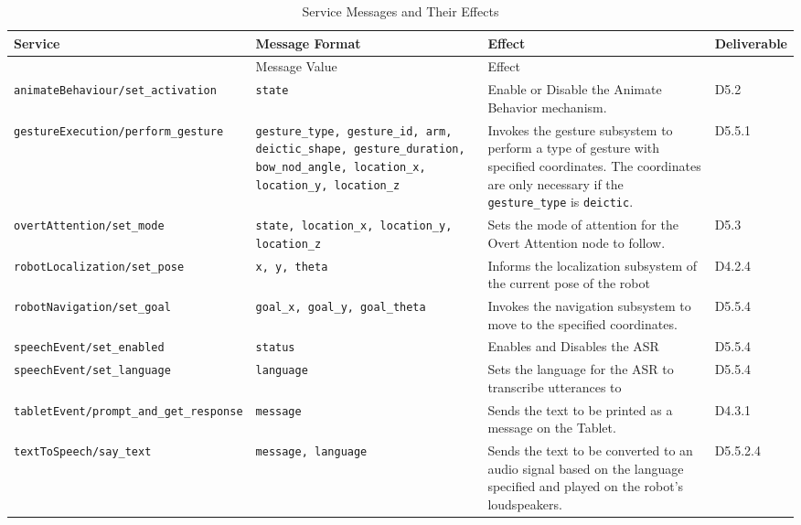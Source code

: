 \documentclass{CSSRforAfrica}
\begin{document}
{\fontsize{9pt}{12pt}\selectfont
\begin{longtable}[c]{|p{6.4cm}|p{2.9cm}|p{3cm}|p{1.4cm}|}
    \caption{Service Messages and Their Effects} \label{tab:service_messages}\\
    \hline
    \rowcolor{gray!30}
    \textnormal{Service} & \textnormal{Message Format} & \textnormal{Effect}& \textnormal{Deliverable}  \\ \hline
    \endfirsthead
    \hline
    \rowcolor{gray!30}
     & \textnormal{Message Value} & \textnormal{Effect} \\ \hline
    \endhead

    \texttt{\footnotesize animateBehaviour/set\_activation} & \texttt{\footnotesize state} & Enable or Disable the Animate Behavior mechanism. &D5.2 \\ \hline
    \texttt{\footnotesize gestureExecution/perform\_gesture} & \texttt{\footnotesize gesture\_type, gesture\_id, arm, deictic\_shape, gesture\_duration, bow\_nod\_angle, location\_x, location\_y, location\_z} & Invokes the gesture subsystem to perform a type of gesture with specified coordinates. The coordinates are only necessary if the \texttt{\footnotesize gesture\_type} is \texttt{\footnotesize deictic}. &D5.5.1 \\ \hline
    \texttt{\footnotesize overtAttention/set\_mode} & \texttt{\footnotesize state, location\_x, location\_y, location\_z} & Sets the mode of attention for the Overt Attention node to follow. &D5.3 \\ \hline
    \texttt{\footnotesize robotLocalization/set\_pose} & \texttt{\footnotesize x, y, theta} & Informs the localization subsystem of the current pose of the robot &D4.2.4 \\ \hline
    \texttt{\footnotesize robotNavigation/set\_goal} & \texttt{\footnotesize goal\_x, goal\_y, goal\_theta} & Invokes the navigation subsystem to move to the specified coordinates. &D5.5.4 \\ \hline
    \texttt{\footnotesize speechEvent/set\_enabled} & \texttt{\footnotesize status} & Enables and Disables the ASR &D5.5.4 \\ \hline
    \texttt{\footnotesize speechEvent/set\_language} & \texttt{\footnotesize language} & Sets the language for the ASR to transcribe utterances to &D5.5.4 \\ \hline
    \texttt{\footnotesize tabletEvent/prompt\_and\_get\_response} & \texttt{\footnotesize message} & Sends the text to be printed as a message on the Tablet. &D4.3.1 \\ \hline
    \texttt{\footnotesize textToSpeech/say\_text} & \texttt{\footnotesize message, language} & Sends the text to be converted to an audio signal based on the language specified and played on the robot's loudspeakers. &D5.5.2.4 \\ \hline

\end{longtable}
}
\end{document}
